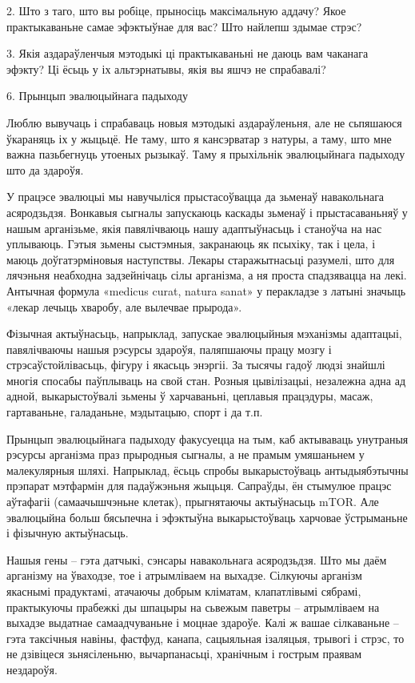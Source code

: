 2. Што з таго, што вы робіце, прыносіць максімальную аддачу? Якое практыкаваньне самае эфэктыўнае для вас? Што найлепш здымае стрэс?

3. Якія аздараўленчыя мэтодыкі ці практыкаваньні не даюць вам чаканага эфэкту? Ці ёсьць у іх альтэрнатывы, якія вы яшчэ не спрабавалі?


6. Прынцып эвалюцыйнага падыходу

Люблю вывучаць і спрабаваць новыя мэтодыкі аздараўленьня, але не сьпяшаюся ўкараняць іх у жыцьцё. Не таму, што я кансэрватар з натуры, а таму, што мне важна пазьбегнуць утоеных рызыкаў. Таму я прыхільнік эвалюцыйнага падыходу што да здароўя.

У працэсе эвалюцыі мы навучыліся прыстасоўвацца да зьменаў навакольнага асяродзьдзя. Вонкавыя сыгналы запускаюць каскады зьменаў і прыстасаваньняў у нашым арганізьме, якія павялічваюць нашу адаптыўнасьць і станоўча на нас уплываюць. Гэтыя зьмены сыстэмныя, закранаюць як псыхіку, так і цела, і маюць доўгатэрміновыя наступствы. Лекары старажытнасьці разумелі, што для лячэньня неабходна задзейнічаць сілы арганізма, а ня проста спадзявацца на лекі. Антычная формула «medicus curat, natura sanat» у перакладзе з латыні значыць «лекар лечыць хваробу, але вылечвае прырода».

Фізычная актыўнасьць, напрыклад, запускае эвалюцыйныя мэханізмы адаптацыі, павялічваючы нашыя рэсурсы здароўя, паляпшаючы працу мозгу і стрэсаўстойлівасьць, фігуру і якасьць энэргіі. За тысячы гадоў людзі знайшлі многія спосабы паўплываць на свой стан. Розныя цывілізацыі, незалежна адна ад адной, выкарыстоўвалі зьмены ў харчаваньні, цеплавыя працэдуры, масаж, гартаваньне, галаданьне, мэдытацыю, спорт і да т.п.

Прынцып эвалюцыйнага падыходу факусуецца на тым, каб актываваць унутраныя рэсурсы арганізма праз прыродныя сыгналы, а не прамым умяшаньнем у малекулярныя шляхі. Напрыклад, ёсьць спробы выкарыстоўваць антыдыябэтычны прэпарат мэтфармін для падаўжэньня жыцьця. Сапраўды, ён стымулюе працэс аўтафагіі (самаачышчэньне клетак), прыгнятаючы актыўнасьць mTOR. Але эвалюцыйна больш бясьпечна і эфэктыўна выкарыстоўваць харчовае ўстрыманьне і фізычную актыўнасьць.

Нашыя гены – гэта датчыкі, сэнсары навакольнага асяродзьдзя. Што мы даём арганізму на ўваходзе, тое і атрымліваем на выхадзе. Сілкуючы арганізм якаснымі прадуктамі, атачаючы добрым кліматам, клапатлівымі сябрамі, практыкуючы прабежкі ды шпацыры на сьвежым паветры – атрымліваем на выхадзе выдатнае самаадчуваньне і моцнае здароўе. Калі ж вашае сілкаваньне – гэта таксічныя навіны, фастфуд, канапа, сацыяльная ізаляцыя, трывогі і стрэс, то не дзівіцеся зьнясіленьню, вычарпанасьці, хранічным і гострым праявам нездароўя.

